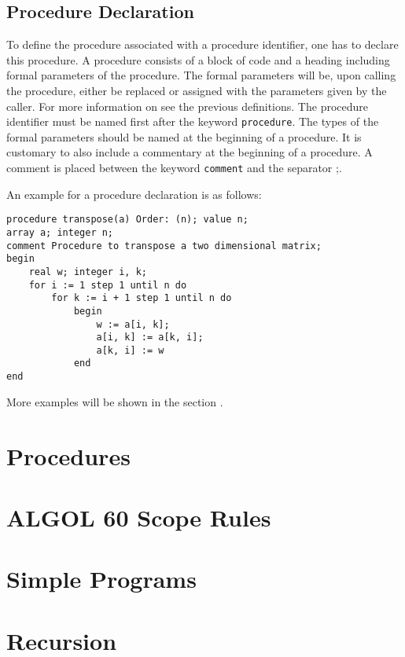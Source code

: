 \documentclass{article}
\begin{document}
\subsection{Procedure Declaration} \label{procDecl}
To define the procedure associated with a procedure identifier, one has to declare this procedure. A procedure consists of a block of code and a heading including formal parameters of the procedure. The formal parameters will be, upon calling the procedure, either be replaced or assigned with the parameters given by the caller. For more information on  see the previous definitions. The procedure identifier must be named first after the keyword \texttt{procedure}. The types of the formal parameters should be named at the beginning of a procedure. It is customary to also include a commentary at the beginning of a procedure. A comment is placed between the keyword \texttt{comment} and the separator ;.

An example for a procedure declaration is as follows:\\ 
\begin{lstlisting}[language={[60]algol}]
procedure transpose(a) Order: (n); value n;
array a; integer n;
comment Procedure to transpose a two dimensional matrix;
begin
    real w; integer i, k;
    for i := 1 step 1 until n do
        for k := i + 1 step 1 until n do
            begin
                w := a[i, k];
                a[i, k] := a[k, i];
                a[k, i] := w
            end
end
\end{lstlisting}

More examples will be shown in the section .

\newpage

\section{Procedures} \label{procedures}

\newpage

\section{ALGOL 60 Scope Rules} \label{scopeRule}

\newpage

\section{Simple Programs} \label{simpleProg}

\newpage

\section{Recursion}
\end{document}
